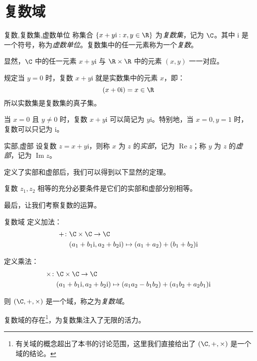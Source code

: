 
\section{复数域}

\begin{definition}{复数,复数集,虚数单位}
	称集合 $\{x + y \mathrm i: x, y \in \R\}$ 为\emph{复数集}，记为 $\C$。其中 $\mathrm i$ 是一个符号，称为\emph{虚数单位}。复数集中的任一元素称为一个\emph{复数}。
\end{definition}

显然，$\C$ 中的任一元素 $x + y \mathrm i$ 与 $\R \times \R$ 中的元素 $(x, y)$ 一一对应。

规定当 $y = 0$ 时，复数 $x + y \mathrm i$ 就是实数集中的元素 $x$，即：
$$
(x + 0 \mathrm i) = x \in \R
$$
所以实数集是复数集的真子集。

当 $x = 0$ 且 $y \ne 0$ 时，复数 $x + y \mathrm i$ 可以简记为 $y \mathrm i$。特别地，当 $x = 0, y = 1$ 时，复数可以只记为 $\mathrm i$。

\begin{definition}{实部,虚部}
	设复数 $z = x + y \mathrm i$，则称 $x$ 为 $z$ 的\emph{实部}，记为 $\operatorname{Re} z$；称 $y$ 为 $z$ 的\emph{虚部}，记为 $\operatorname{Im} z$。
\end{definition}

定义了实部和虚部后，我们可以得到以下显然的定理。

\begin{theorem}[复数相等]
	复数 $z_1, z_2$ 相等的充分必要条件是它们的实部和虚部分别相等。
\end{theorem}

最后，让我们考察复数的运算。

\begin{definition}{复数域}
	定义加法：
	$$
	\begin{aligned}
		{+} \colon & \C \times \C \to \C
		\\&
		(a_1 + b_1 \mathrm i, a_2 + b_2 \mathrm i) \mapsto (a_1 + a_2) + (b_1 + b_2) \mathrm i
	\end{aligned}
	$$

	定义乘法：
	$$
	\begin{aligned}
		{\times} \colon & \C \times \C \to \C
		\\&
		(a_1 + b_1 \mathrm i, a_2 + b_2 \mathrm i) \mapsto (a_1 a_2 - b_1 b_2) + (a_1 b_2 + a_2 b_1) \mathrm i
	\end{aligned}
	$$

	则 $(\C, {+}, {\times})$ 是一个域，称之为\emph{复数域}。
\end{definition}

复数域的存在\footnote{有关域的概念超出了本书的讨论范围，这里我们直接给出了 $(\C, {+}, {\times})$ 是一个域的结论。}，为复数集注入了无限的活力。